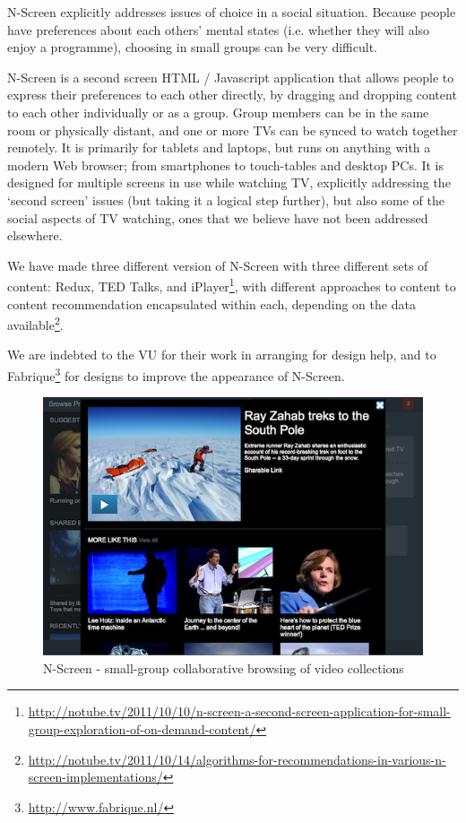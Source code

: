 \documentclass{notube}
\begin{document}
N-Screen explicitly addresses issues of choice in a social situation. Because people have preferences about each others' mental states (i.e. whether they will also enjoy a programme), choosing in small groups can be very difficult. 

N-Screen is a second screen HTML / Javascript application that allows people to express their preferences to each other directly, by dragging and dropping content to each other individually or as a group. Group members can be in the same room or physically distant, and one or more TVs can be synced to watch together remotely. It is primarily for tablets and laptops, but runs on anything with a modern Web browser; from smartphones to touch-tables and desktop PCs. It is designed for multiple screens in use while watching TV, explicitly addressing the `second screen' issues (but taking it a logical step further), but also some of the social aspects of TV watching, ones that we believe have not been addressed elsewhere.

We have made three different version of N-Screen with three different sets of content: Redux, TED Talks, and iPlayer\footnote{\url{http://notube.tv/2011/10/10/n-screen-a-second-screen-application-for-small-group-exploration-of-on-demand-content/}}, with different approaches to content to content recommendation encapsulated within each, depending on the data available\footnote{\url{http://notube.tv/2011/10/14/algorithms-for-recommendations-in-various-n-screen-implementations/}}.

We are indebted to the VU for their work in arranging for design help, and to Fabrique\footnote{\url{http://www.fabrique.nl/}} for designs to improve the appearance of N-Screen.

\begin{figure}[htbp]
\begin{center}
\includegraphics[width=6in]{images/nscreen.png}
\caption{N-Screen - small-group collaborative browsing of video collections} \label{fig:nscreen}
\end{center}
\end{figure} 
\end{document}
